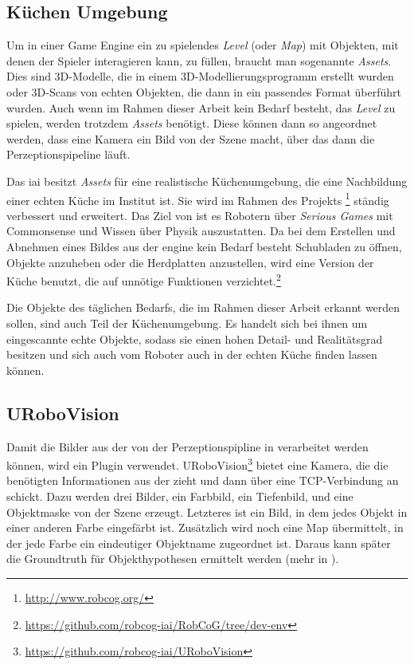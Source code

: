 \subsection{Küchen Umgebung}
\label{subsec:kitchenenvironment}
Um in einer Game Engine ein zu spielendes \textit{Level} (oder \textit{Map}) mit Objekten, mit denen der Spieler interagieren kann, zu füllen, braucht man sogenannte \textit{Assets}. Dies sind 3D-Modelle, die in einem 3D-Modellierungsprogramm erstellt wurden oder 3D-Scans von echten Objekten, die dann in ein passendes Format überführt wurden. Auch wenn im Rahmen dieser Arbeit kein Bedarf besteht, das \textit{Level} zu spielen, werden trotzdem \textit{Assets} benötigt. Diese können dann so angeordnet werden, dass eine Kamera ein Bild von der Szene macht, über das dann die Perzeptionspipeline läuft. \par
Das \gls{iai} besitzt \textit{Assets} für eine realistische Küchenumgebung, die eine Nachbildung einer echten Küche im Institut ist. Sie wird im Rahmen des Projekts \robcog\footnote{\url{http://www.robcog.org/}} ständig verbessert und erweitert. Das Ziel von \robcog ist es Robotern über \textit{Serious Games} mit Commonsense und Wissen über Physik auszustatten. Da bei dem Erstellen und Abnehmen eines Bildes aus der \acrshort{engine} kein Bedarf besteht Schubladen zu öffnen, Objekte anzuheben oder die Herdplatten anzustellen, wird eine Version der Küche benutzt, die auf unnötige Funktionen verzichtet.\footnote{\url{https://github.com/robcog-iai/RobCoG/tree/dev-env}} \par
Die Objekte des täglichen Bedarfs, die im Rahmen dieser Arbeit erkannt werden sollen, sind auch Teil der Küchenumgebung. Es handelt sich bei ihnen um eingescannte echte Objekte, sodass sie einen hohen Detail- und Realitätsgrad besitzen und sich auch vom Roboter auch in der echten Küche finden lassen können.
 
\subsection{URoboVision}
\label{subsec:urobovision}
Damit die Bilder aus der \unreal von der Perzeptionspipline in \robosherlock verarbeitet werden können, wird ein \unreal Plugin verwendet. URoboVision\footnote{\url{https://github.com/robcog-iai/URoboVision}} bietet eine Kamera, die die benötigten Informationen aus der \unreal zieht und dann über eine TCP-Verbindung an \robosherlock schickt. Dazu werden drei Bilder, ein Farbbild, ein Tiefenbild, und eine Objektmaske von der Szene erzeugt. Letzteres ist ein Bild, in dem jedes Objekt in einer anderen Farbe eingefärbt ist. Zusätzlich wird noch eine Map übermittelt, in der jede Farbe ein eindeutiger Objektname zugeordnet ist. Daraus kann später die Groundtruth für Objekthypothesen  ermittelt werden (mehr in ).   

